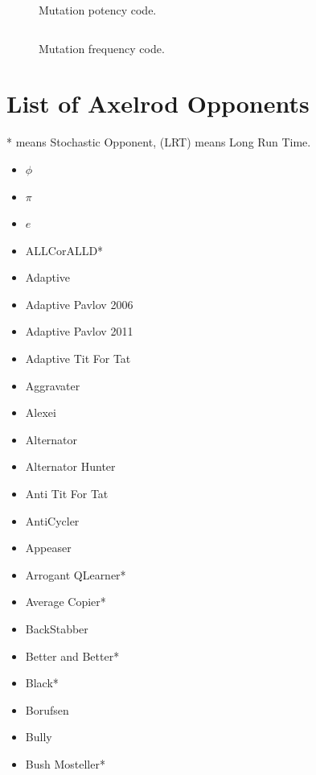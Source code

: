 \begin{appendices}
    \begin{figure}
        \inputminted{python}{code_snippets/mutationPotencyChecker.py}
        \caption{Mutation potency code.}\label{apcode:mutationPotencyChecker.py}
    \end{figure}

    \begin{figure}
        \inputminted{python}{code_snippets/mutationFrequencyChecker.py}
        \caption{Mutation frequency code.}\label{apcode:mutationFrequencyChecker.py}
    \end{figure}

    \chapter{List of Axelrod Opponents}\label{apndx:opponents}
    * means Stochastic Opponent, (LRT) means Long Run Time.
    \begin{multicols}{4}
        \begin{itemize}
            \item $\phi$
            \item $\pi$
            \item $e$
            \item ALLCorALLD*
            \item Adaptive
            \item Adaptive Pavlov 2006
            \item Adaptive Pavlov 2011
            \item Adaptive Tit For Tat
            \item Aggravater
            \item Alexei
            \item Alternator
            \item Alternator Hunter
            \item Anti Tit For Tat
            \item AntiCycler
            \item Appeaser
            \item Arrogant QLearner*
            \item Average Copier*
            \item BackStabber
            \item Better and Better*
            \item Black*
            \item Borufsen
            \item Bully
            \item Bush Mosteller*

\end{itemize}
\end{multicols}
\end{appendices}
